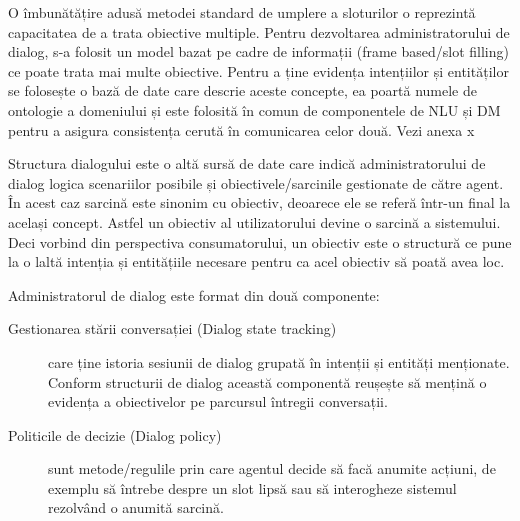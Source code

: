 O îmbunătățire adusă metodei standard de umplere a sloturilor o reprezintă capacitatea de a trata obiective multiple.
Pentru dezvoltarea administratorului de dialog, s-a folosit un model bazat pe cadre de informații (frame based/slot filling) ce poate trata mai multe obiective.
Pentru a ține evidența intențiilor și entităților se folosește o bază de date care descrie aceste concepte, ea poartă numele de ontologie a domeniului și este folosită în comun de componentele de NLU și DM pentru a asigura consistența cerută în comunicarea celor două. Vezi anexa x

Structura dialogului este o altă sursă de date care indică administratorului de dialog logica scenariilor posibile și obiectivele/sarcinile gestionate de către agent. În acest caz sarcină este sinonim cu obiectiv, deoarece ele se referă într-un final la același concept. Astfel un obiectiv al utilizatorului devine o sarcină a sistemului. Deci vorbind din perspectiva consumatorului, un obiectiv este o structură ce pune la o laltă intenția și entitățiile necesare pentru ca acel obiectiv să poată avea loc.

Administratorul de dialog este format din două componente: 
\begin{description}
	\item[Gestionarea stării conversației (Dialog state tracking)] care ține istoria sesiunii de dialog grupată în intenții și entități menționate. Conform structurii de dialog această componentă reușește să mențină o evidența a obiectivelor pe parcursul întregii conversații.
	\item[Politicile de decizie (Dialog policy)] sunt metode/regulile prin care agentul decide să facă anumite acțiuni, de exemplu să întrebe despre un slot lipsă sau să interogheze sistemul rezolvând o anumită sarcină.
\end{description}



